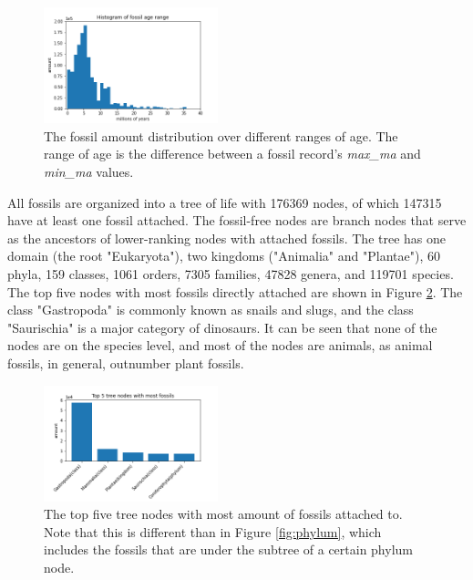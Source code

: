 \documentclass[11pt, a4paper,oneside,chapterprefix=false]{scrbook}
\begin{document}
\begin{figure}[h]
	\centering
	\includegraphics[width=0.45\textwidth]{figures/result/age_range}
	\caption{The fossil amount distribution over different ranges of age. The range of age is the difference between a fossil record's \emph{max\_ma} and \emph{min\_ma} values. }
	\label{fig:age_range}
\end{figure}

All fossils are organized into a tree of life with 176369 nodes, of which 147315 have at least one fossil attached. The fossil-free nodes are branch nodes that serve as the ancestors of lower-ranking nodes with attached fossils. The tree has one domain (the root "Eukaryota"), two kingdoms ("Animalia" and "Plantae"), 60 phyla, 159 classes, 1061 orders, 7305 families, 47828 genera, and 119701 species. The top five nodes with most fossils directly attached are shown in Figure \ref{fig:top_nodes}. The class "Gastropoda" is commonly known as snails and slugs, and the class "Saurischia" is a major category of dinosaurs. It can be seen that none of the nodes are on the species level, and most of the nodes are animals, as animal fossils, in general, outnumber plant fossils. \\

\begin{figure}[h]
	\centering
	\includegraphics[width=0.45\textwidth]{figures/result/top_nodes}
	\caption{The top five tree nodes with most amount of fossils attached to. Note that this is different than in Figure \ref{fig:phylum}, which includes the fossils that are under the subtree of a certain phylum node.}
	\label{fig:top_nodes}
\end{figure}
\end{document}
